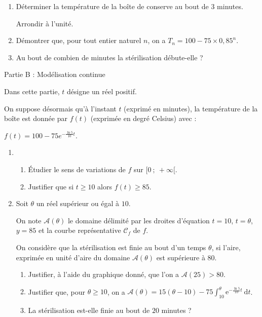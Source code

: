 \begin{enumerate}
     \item
     Déterminer la température de la boîte de conserve au bout de 3 minutes.
     \par
     Arrondir à l'unité.
     \item
     Démontrer que, pour tout entier naturel $n$, on a $T_n = 100-75 \times 0,85^n$.
     \item
     Au bout de combien de minutes la stérilisation débute-elle ?
\end{enumerate}
\begin{h3}Partie B : Modélisation continue\end{h3}
Dans cette partie, $t$ désigne un réel positif.
\par
On suppose désormais qu'à l'instant $t$ (exprimé en minutes), la température de la boîte est donnée par $f(t)$ (exprimée en degré Celsius) avec :
\begin{center}$f(t) = 100-75{e}^{- \frac{\ln 5}{10}t}$.\end{center}
\begin{enumerate}
     \item
     \begin{enumerate}
          \item
          Étudier le sens de variations de $f$ sur $[0~;~+ \infty[$.
          \item
          Justifier que si $t \geqslant 10$ alors $f(t) \geqslant 85$.
     \end{enumerate}
     \item
     Soit $\theta$ un réel supérieur ou égal à $10$.
     \par
     On note $\mathcal{A}(\theta)$ le domaine délimité par les droites d'équation $t = 10$, $t = \theta$, $y = 85$ et la courbe représentative $\mathscr{C}_f$ de $f$.
     \par
     On considère que la stérilisation est finie au bout d'un temps $\theta$, si l'aire, exprimée en unité d'aire du domaine $\mathcal{A}(\theta)$ est supérieure à $80$.
\begin{center}
\end{center}
     \begin{enumerate}
          \item
          Justifier, à l'aide du graphique donné, que l'on a $\mathcal{A}(25) > 80$.
          \item
          Justifier que, pour $\theta \geqslant 10$, on a $\mathcal{A}(\theta) = 15(\theta-10)-75 \int_{10}^{\theta} \text{e}^{- \frac{\ln 5}{10}t}\:\text{d}t$.
          \item
          La stérilisation est-elle finie au bout de $20$ minutes ?
     \end{enumerate}
\end{enumerate}
